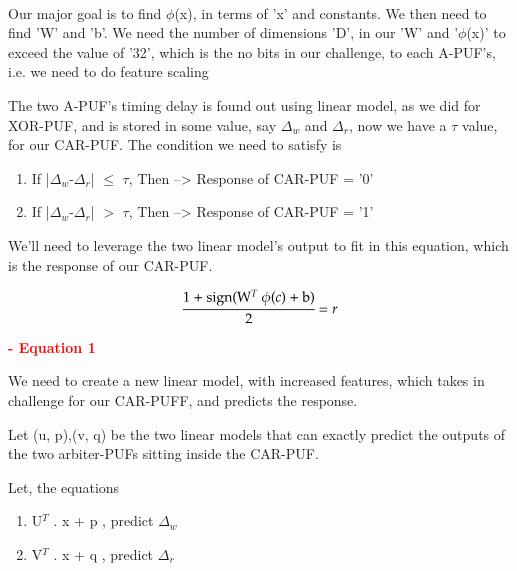 \documentclass[11 pt]{article}
\begin{document}
{\paragraph{}

Our major goal is to find $\phi$(x), in terms of 'x' and constants. We then need to find 'W' and 'b'.
We need the number of dimensions 'D', in our 'W' and '$\phi$(x)' to exceed the value of '32', which is the no bits in our challenge, to each A-PUF's, i.e. we need to do feature scaling

The two A-PUF's timing delay is found out using linear model, as we did for XOR-PUF, and is stored in some value, say $\Delta$$_w$ and $\Delta$$_r$, now we have a $\tau$ value, for our CAR-PUF. The condition we need to satisfy is 
\begin{enumerate}
    \item If |$\Delta$$_w$-$\Delta$$_r$| $\leq$ $\tau$, Then --> Response of CAR-PUF = '0'
    \item If |$\Delta$$_w$-$\Delta$$_r$| $>$ $\tau$, Then --> Response of CAR-PUF = '1'
\end{enumerate}    

We'll need to leverage the two linear model's output to fit in this equation, which is the response of our CAR-PUF.

\vspace{0.33 cm} 

\[
\cfrac{\text{1 + sign(W$^T$ $\phi(c)$  + b)}}{\text{2}}={r}
\]
\begin{flushright} \textbf{\textcolor{red}{- Equation 1}} \end{flushright}

\vspace{0.33 cm} 

We need to create a new linear model, with increased features, which takes in challenge for our CAR-PUFF, and predicts the response.

\vspace{0.33 cm} 

Let (u, p),(v, q) be the two linear models that can exactly predict the outputs of the two arbiter-PUFs sitting inside the CAR-PUF.

\vspace{0.33 cm} 

Let, the equations 
\begin{enumerate} 
\item U$^T$ . x  + p , predict $\Delta$$_w$
\item V$^T$ . x  + q , predict $\Delta$$_r$
\end{enumerate} 

}
\end{document}
